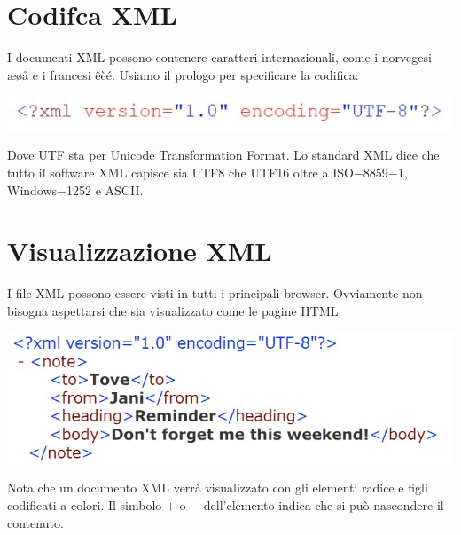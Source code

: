 \section{Codifca XML}
I documenti XML possono contenere caratteri internazionali, come i norvegesi æøå e i francesi êèé. Usiamo il prologo per specificare la codifica:

\begin{center}
    \includegraphics[scale=0.4]{Images/TecnologieWeb/5/xmlversion.jpg}
\end{center}
Dove UTF sta per Unicode Transformation Format. Lo standard XML dice che tutto il software XML capisce sia UTF8 che UTF16 oltre a ISO$-$8859$-$1, Windows$-$1252 e ASCII.

\section{Visualizzazione XML}
I file XML possono essere visti in tutti i principali browser. Ovviamente non bisogna aspettarsi che sia visualizzato come le pagine HTML. 
\begin{center}
    \includegraphics[scale=0.4]{Images/TecnologieWeb/5/Reminder.jpg}
\end{center}
Nota che un documento XML verrà visualizzato con gli elementi radice e figli codificati a colori. Il simbolo $+$ o $-$ dell'elemento indica che si può nascondere il contenuto. 


